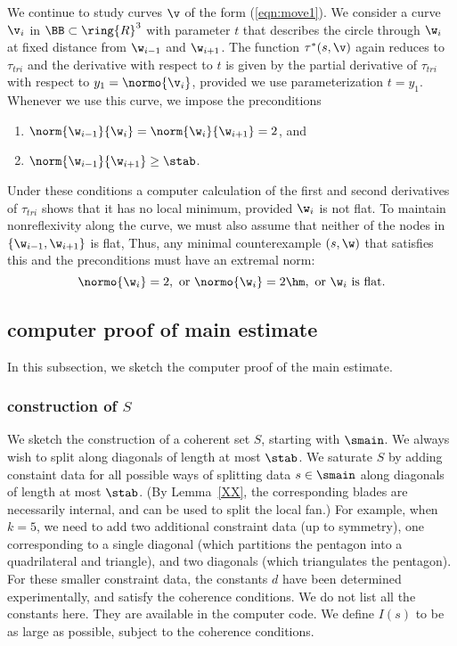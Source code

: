\begin{remark}\label{rem:radial}
We continue to study curves $\v$ of the form (\ref{eqn:move1}).  We
consider a curve $\v_i$ in $\BB\subset\ring{R}^3$ with parameter $t$ that
describes the circle through $\w_i$ at fixed distance from $\w_{i-1}$ and
$\w_{i+1}$. 
The function $\tau^*(s,\v)$ again reduces to
$\tau_{tri}$ and the derivative with respect to $t$ is given by the
partial derivative of $\tau_{tri}$ with respect to  $y_1=\normo{\v_i}$,
provided we use parameterization $t=y_1$.
 Whenever we use this curve, we  impose the preconditions
\begin{enumerate}
\item $\norm{\w_{i-1}}{\w_i}=\norm{\w_i}{\w_{i+1}}=2$, and
\item $\norm{\w_{i-1}}{\w_{i+1}} \ge \stab$.
\end{enumerate}
Under these conditions a computer calculation of the first and second
derivatives of $\tau_{tri}$ shows that it has no local minimum, provided
$\w_i$ is not flat.
To maintain nonreflexivity along the curve, we must also assume that
 neither of the nodes in $\{\w_{i-1},\w_{i+1}\}$ is flat,
Thus,  any minimal counterexample $(s,\w)$ that satisfies this and
the preconditions
must have an extremal norm:
\begin{equation}\label{eqn:extremal}
\normo{\w_i}=2,\text{ or } \normo{\w_i}=2\hm, \text{ or } \w_i
\text{ is flat.}
\end{equation}
\end{remark}

\subsection{computer proof of main estimate}

In this subsection, we sketch the computer proof of the main estimate.

\subsubsection{construction of $S$}

We sketch the construction of a coherent set $S$, starting with $\smain$.
We always wish to split along diagonals of length at most $\stab$. 
We saturate $S$ by adding constaint data for
all possible ways of  splitting data $s\in \smain$
along diagonals of length at most $\stab$.  (By Lemma~\ref{XX}, the
corresponding blades are necessarily internal, and can be used to
split the local fan.)  For example, when $k=5$, we need to add two
additional constraint data (up to symmetry), one corresponding to a
single diagonal (which partitions the pentagon into a quadrilateral
and triangle), and two diagonals (which triangulates the pentagon).
For these smaller constraint data, the constants $d$ have been
determined experimentally, and satisfy the coherence conditions.  We
do not list all the constants here.  They are available in the
computer code.  We define $I(s)$ to be as large as possible, subject
to the coherence conditions.  

